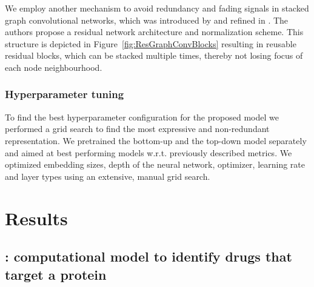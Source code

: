 \documentclass{bioinfo}
\begin{document}
We employ another mechanism to avoid redundancy and fading signals in
stacked graph convolutional networks, which was introduced by
\citet{DeepGCN2019} and refined in \citet{DeeperGCN2020}. The authors
propose a residual network architecture and normalization scheme. This
structure is depicted in Figure~\ref{fig:ResGraphConvBlocks} resulting
in reusable residual blocks, which can be stacked multiple times,
thereby not losing focus of each node neighbourhood.



\subsubsection{Hyperparameter tuning}
To find the best hyperparameter configuration for the proposed model
we performed a grid search to find the most expressive and
non-redundant representation. We pretrained the bottom-up and the
top-down model separately and aimed at best performing models
w.r.t. previously described metrics. We optimized embedding sizes,
depth of the neural network, optimizer, learning rate and layer types
using an extensive, manual grid search. 


\section{Results}

\subsection{\name: computational model to identify drugs that target a
	protein}

\end{document}
